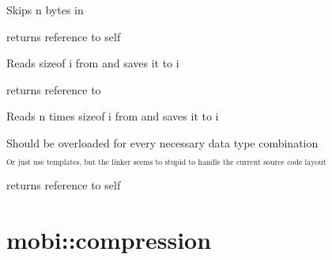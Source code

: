 \documentclass[letterpaper,10pt,english]{sphinxmanual}
\begin{document}

\begin{fulllineitems}
\label{header_handler:header_handler::skip__unsigned-i}
Skips n bytes in {\hyperref[header_handler:header_handler::file__std::ifstreamP]{}}

returns reference to self

\end{fulllineitems}


\begin{fulllineitems}
\label{header_handler:header_handler::read__typeR}
Reads sizeof i from {\hyperref[header_handler:header_handler::file__std::ifstreamP]{}} and saves it to i

returns reference to {\hyperref[header_handler:header_handler]{}}

\end{fulllineitems}


\begin{fulllineitems}
\label{header_handler:header_handler::read__typeR.unsigned-i}
Reads n times sizeof i from {\hyperref[header_handler:header_handler::file__std::ifstreamP]{}} and saves it to i

Should be overloaded for every necessary data type combination

$_{\text{Or just use templates, but the linker seems to stupid to handle the current
source code layout}}$

returns reference to self

\end{fulllineitems}



\section{mobi::compression}
\label{compression::doc}\label{compression:mobi-compression}
\end{document}
